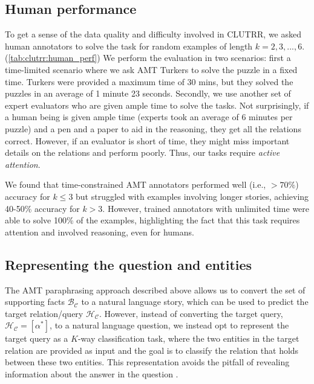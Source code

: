 \documentclass[letterpaper, 12pt]{report}
\begin{document}
\subsection{Human performance}



To get a sense of the data quality and difficulty involved in CLUTRR, we asked human annotators to solve the task for random examples of length $k=2,3,...,6$. (\autoref{tab:clutrr:human_perf})
We perform the evaluation in two scenarios: first a time-limited scenario where we ask AMT Turkers to solve the puzzle in a fixed time. Turkers were provided a maximum time of 30 mins, but they solved the puzzles in an average of 1 minute 23 seconds. Secondly, we use another set of expert evaluators who are given ample time to solve the tasks. Not surprisingly, if a human being is given ample time (experts took an average of 6 minutes per puzzle) and a pen and a paper to aid in the reasoning, they get all the relations correct. However, if an evaluator is short of time, they might miss important details on the relations and perform poorly. Thus, our tasks require \textit{active attention}.

We found that time-constrained AMT annotators performed well (i.e., ${>70\%}$) accuracy for ${k\leq 3}$ but struggled with examples involving longer stories, achieving 40-50\% accuracy for ${k > 3}$. However, trained annotators with unlimited time were able to solve 100\% of the examples, highlighting the fact that this task requires attention and involved reasoning, even for humans.

\subsection{Representing the question and entities}

The AMT paraphrasing approach described above allows us to convert the set of supporting facts $\mathcal{B}_{\mathcal{C}}$ to a natural language story, which can be used to predict the target relation/query $\mathcal{H}_{\mathcal{C}}$.
However, instead of converting the target query, $\mathcal{H}_{\mathcal{C}} = [\alpha^*]$, to a natural language question, we instead opt to represent the target query as a $K$-way classification task, where the two entities in the target relation are provided as input and the goal is to classify the relation that holds between these two entities.
This representation avoids the pitfall of revealing information about the answer in the question \citep{kaushik2018much}.
\end{document}
